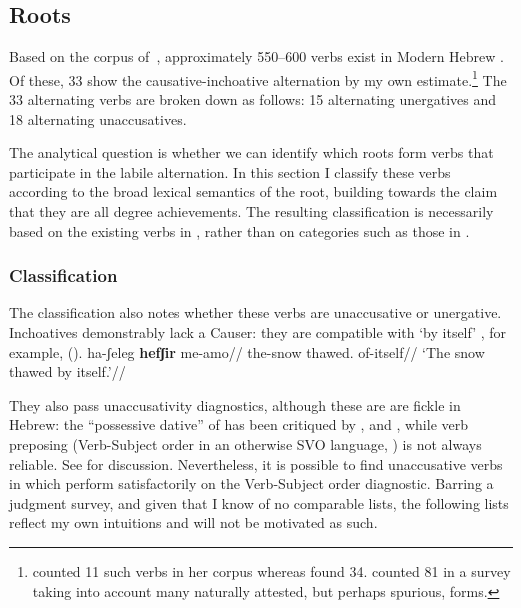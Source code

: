 	\subsection{Roots} \label{vd:inch:roots}
Based on the corpus of~\cite{ehrenfeld12}, approximately 550--600 verbs exist in Modern Hebrew {\thif}. Of these, 33 show the causative-inchoative alternation by my own estimate.\footnote{\cite{arad05} counted 11 such verbs in her corpus whereas \cite{laks11} found 34. \cite{lev16} counted 81 in a survey taking into account many naturally attested, but perhaps spurious, forms.} The 33 alternating verbs are broken down as follows: 15 alternating unergatives and 18 alternating unaccusatives. 

The analytical question is whether we can identify which roots form verbs that participate in the labile alternation. In this section I classify these verbs according to the broad lexical semantics of the root, building towards the claim that they are all degree achievements. The resulting classification is necessarily based on the existing verbs in {\thif}, rather than on categories such as those in \cite{levin93}.

	\subsubsection{Classification}
The classification also notes whether these verbs are unaccusative or unergative. Inchoatives demonstrably lack a Causer: they are compatible with `by itself' \citep{unaccusativity95,alexiadouanagnostopoulou04,koontzgarboden09,alexiadoudoron12,kastner17gjgl}, for example, (\nextx).
\ex
	\begingl
	\gla ha-ʃeleg \textbf{hefʃir} me-a{\texttslig}mo//
	\glb the-snow thawed. of-itself//
	\glft `The snow thawed by itself.'//
	\endgl
\xe

They also pass unaccusativity diagnostics, although these are are fickle in Hebrew: the ``possessive dative'' of \cite{borergrodzinsky86} has been critiqued by \cite{gafter14li}, \cite{linzen14pd} and \cite{barashersiegalboneh15,barashersiegalboneh16}, while verb preposing (Verb-Subject order in an otherwise SVO language, \citealt{shlonsky87}) is not always reliable. See \cite{kastner17gjgl} for discussion. Nevertheless, it is possible to find unaccusative verbs in {\thif} which perform satisfactorily on the Verb-Subject order diagnostic. Barring a judgment survey, and given that I know of no comparable lists, the following lists reflect my own intuitions and will not be motivated as such.


